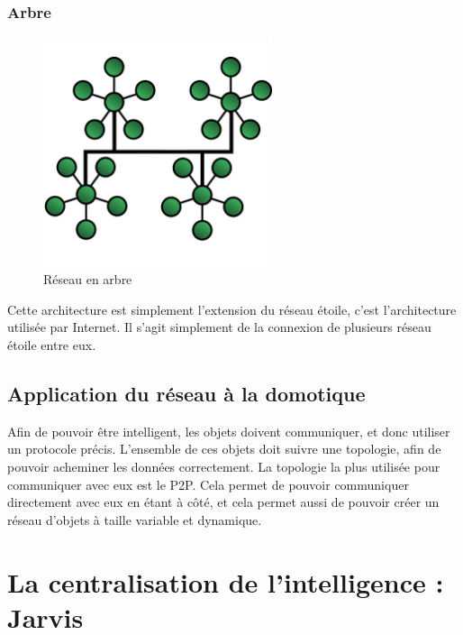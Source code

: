 	    \subsubsection{Arbre}
\begin{figure}[!ht]
         \centering
         \includegraphics[width=0.6\textwidth]{img/TreeTopology.png}
         \caption{Réseau en arbre}
         \label{TreeNetwork}
\end{figure}
Cette architecture est simplement l'extension du réseau étoile, c'est l'architecture utilisée par Internet. 
Il s'agit simplement de la connexion de plusieurs réseau étoile entre eux.
	\subsection{Application du réseau à la domotique}
Afin de pouvoir être intelligent, les objets doivent communiquer, et donc utiliser un protocole précis. 
L'ensemble de ces objets doit suivre une topologie, afin de pouvoir acheminer les données correctement. La 
topologie la plus utilisée pour communiquer avec eux est le P2P. Cela permet de pouvoir communiquer 
directement avec eux en étant à côté, et cela permet aussi de pouvoir créer un réseau d'objets à taille 
variable et dynamique.


\section{La centralisation de l’intelligence : Jarvis}

